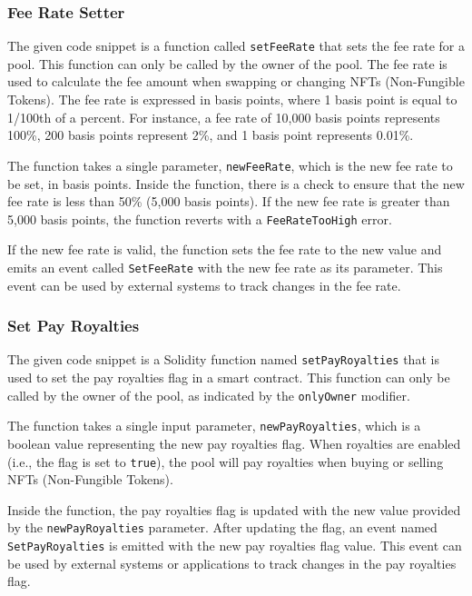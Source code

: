 \hypertarget{fee-rate-setter}{%
\subsubsection{Fee Rate Setter}\label{fee-rate-setter}}

The given code snippet is a function called \texttt{setFeeRate} that
sets the fee rate for a pool. This function can only be called by the
owner of the pool. The fee rate is used to calculate the fee amount when
swapping or changing NFTs (Non-Fungible Tokens). The fee rate is
expressed in basis points, where 1 basis point is equal to 1/100th of a
percent. For instance, a fee rate of 10,000 basis points represents
100\%, 200 basis points represent 2\%, and 1 basis point represents
0.01\%.

The function takes a single parameter, \texttt{newFeeRate}, which is the
new fee rate to be set, in basis points. Inside the function, there is a
check to ensure that the new fee rate is less than 50\% (5,000 basis
points). If the new fee rate is greater than 5,000 basis points, the
function reverts with a \texttt{FeeRateTooHigh} error.

If the new fee rate is valid, the function sets the fee rate to the new
value and emits an event called \texttt{SetFeeRate} with the new fee
rate as its parameter. This event can be used by external systems to
track changes in the fee rate.

\hypertarget{set-pay-royalties}{%
\subsubsection{Set Pay Royalties}\label{set-pay-royalties}}

The given code snippet is a Solidity function named
\texttt{setPayRoyalties} that is used to set the pay royalties flag in a
smart contract. This function can only be called by the owner of the
pool, as indicated by the \texttt{onlyOwner} modifier.

The function takes a single input parameter, \texttt{newPayRoyalties},
which is a boolean value representing the new pay royalties flag. When
royalties are enabled (i.e., the flag is set to \texttt{true}), the pool
will pay royalties when buying or selling NFTs (Non-Fungible Tokens).

Inside the function, the pay royalties flag is updated with the new
value provided by the \texttt{newPayRoyalties} parameter. After updating
the flag, an event named \texttt{SetPayRoyalties} is emitted with the
new pay royalties flag value. This event can be used by external systems
or applications to track changes in the pay royalties flag.

